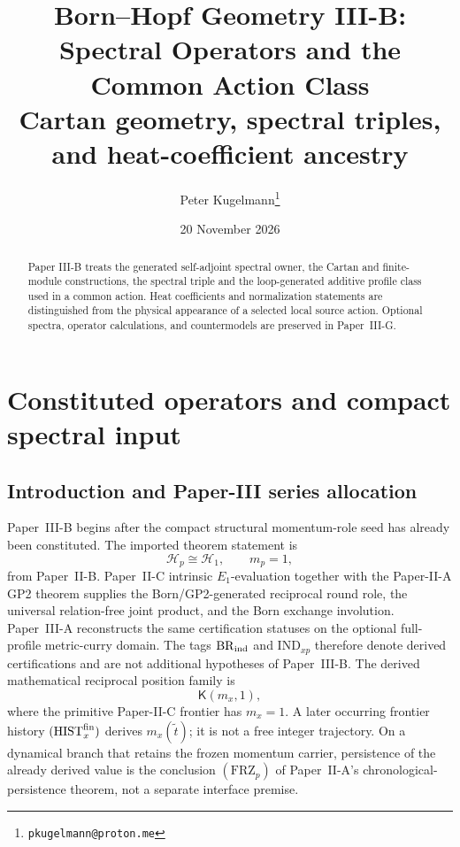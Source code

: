 \documentclass[12pt,a4paper]{article}
\title{\textbf{Born--Hopf Geometry III-B: Spectral Operators and the Common Action Class}\\[0.5em]
\large Cartan geometry, spectral triples, and heat-coefficient ancestry}
\author{Peter Kugelmann\thanks{\texttt{pkugelmann@proton.me}}}
\date{20 November 2026}
\begin{document}
\maketitle
\begin{abstract}
Paper III-B treats the generated self-adjoint spectral owner, the
Cartan and finite-module constructions, the spectral triple and the
loop-generated additive profile class used in a common action. Heat
coefficients and normalization statements are distinguished from the
physical appearance of a selected local source action. Optional spectra,
operator calculations, and countermodels are preserved in Paper~III-G.
\end{abstract}
\tableofcontents
\clearpage

\section{Constituted operators and compact spectral input}
\label{paper3b:sec:organized-scope}
\subsection{Introduction and Paper-III series allocation}
\label{p3b:sec:series-allocation}
Paper~III-B begins after the compact structural momentum-role seed has already
been constituted.  The imported theorem statement is
\[
 \boxed{\mathcal H_p\cong\mathcal H_1,\qquad m_p=1},
\]
from Paper~II-B.  Paper~II-C intrinsic \(E_1\)-evaluation together with the
Paper-II-A GP2 theorem supplies the Born/GP2-generated reciprocal round role, the
universal relation-free joint product, and the Born exchange involution.
Paper~III-A reconstructs the same certification statuses on the optional
full-profile metric-curry domain.  The tags \(\mathrm{BR}_{\rm ind}\) and
\(\mathrm{IND}_{xp}\) therefore denote derived certifications and are not
additional hypotheses of Paper~III-B.  The derived mathematical reciprocal
position family is
\[
 \mathsf K(m_x,1),
\]
where the primitive Paper-II-C frontier has \(m_x=1\).  A later occurring
frontier history \((\mathrm{HIST}_x^{\rm fin})\) derives
\(m_x(\widetilde t)\); it is not a free integer trajectory.  On a dynamical
branch that retains the frozen momentum carrier, persistence of the already
derived value is the conclusion \((\mathrm{FRZ}_p)\) of Paper~II-A's
chronological-persistence theorem, not a separate interface premise.
\end{document}
